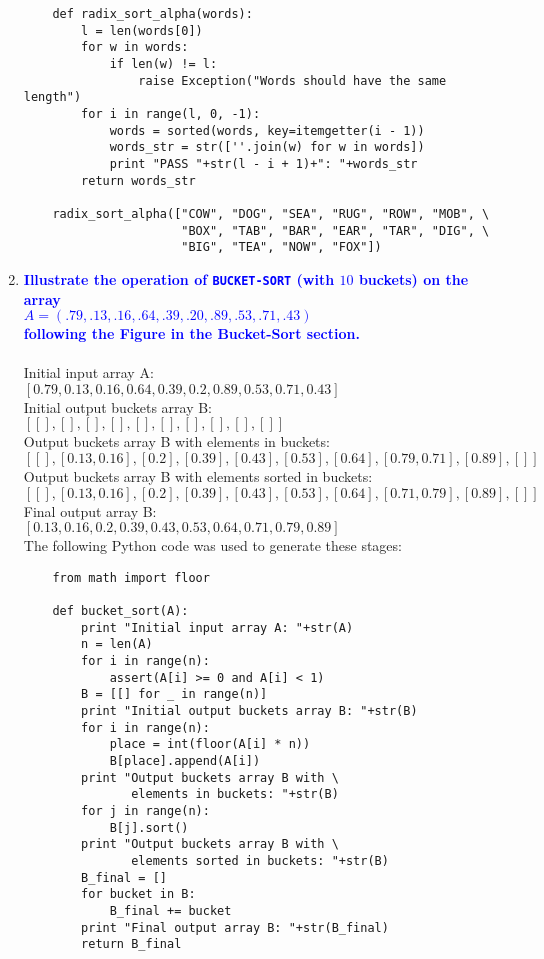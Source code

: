 \documentclass{article}
\begin{document}
\begin{enumerate}
\begin{verbatim}
    def radix_sort_alpha(words):
        l = len(words[0])
        for w in words:
            if len(w) != l:
                raise Exception("Words should have the same length")
        for i in range(l, 0, -1):
            words = sorted(words, key=itemgetter(i - 1))
            words_str = str([''.join(w) for w in words])
            print "PASS "+str(l - i + 1)+": "+words_str
        return words_str
            
    radix_sort_alpha(["COW", "DOG", "SEA", "RUG", "ROW", "MOB", \
                      "BOX", "TAB", "BAR", "EAR", "TAR", "DIG", \
                      "BIG", "TEA", "NOW", "FOX"])
    \end{verbatim}

\item \textbf{\textcolor{blue}{Illustrate the operation of {\tt BUCKET-SORT} 
(with $10$ buckets)
on the
array \\ $A=(.79,.13,.16,.64,.39,.20,.89,.53,.71,.43)$ \\  following
the Figure in the Bucket-Sort section.}}
    \\\\ Initial input array A: 
    \\ $[0.79, 0.13, 0.16, 0.64, 0.39, 0.2, 0.89, 0.53, 0.71, 0.43]$
    \\ Initial output buckets array B:
    \\ $[[], [], [], [], [], [], [], [], [], []]$
    \\ Output buckets array B with elements in buckets:
    \\ $[[], [0.13, 0.16], [0.2], [0.39], [0.43], [0.53], [0.64], [0.79, 0.71], [0.89], []]$
    \\ Output buckets array B with elements sorted in buckets:
    \\ $[[], [0.13, 0.16], [0.2], [0.39], [0.43], [0.53], [0.64], [0.71, 0.79], [0.89], []]$
    \\ Final output array B:
    \\ $[0.13, 0.16, 0.2, 0.39, 0.43, 0.53, 0.64, 0.71, 0.79, 0.89]$
    \\ The following Python code was used to generate these stages:
    \begin{verbatim}
    from math import floor
                 
    def bucket_sort(A):
        print "Initial input array A: "+str(A)
        n = len(A)
        for i in range(n):
            assert(A[i] >= 0 and A[i] < 1)
        B = [[] for _ in range(n)]
        print "Initial output buckets array B: "+str(B)
        for i in range(n):
            place = int(floor(A[i] * n))
            B[place].append(A[i])
        print "Output buckets array B with \
               elements in buckets: "+str(B)
        for j in range(n):
            B[j].sort()
        print "Output buckets array B with \
               elements sorted in buckets: "+str(B)
        B_final = []
        for bucket in B:
            B_final += bucket
        print "Final output array B: "+str(B_final)
        return B_final
        

\end{verbatim}
\end{enumerate}
\end{document}
